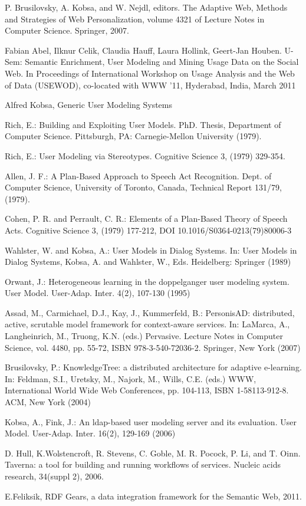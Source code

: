 \begin{thebibliography}{99}

 P. Brusilovsky, A. Kobsa, and W. Nejdl, editors. The Adaptive Web, Methods and Strategies of Web Personalization, volume 4321 of Lecture Notes in Computer Science. Springer, 2007.

 Fabian Abel, Ilknur Celik, Claudia Hauff, Laura Hollink, Geert-Jan Houben. U-Sem: Semantic Enrichment, User Modeling and Mining Usage Data on the Social Web. In Proceedings of International Workshop on Usage Analysis and the Web of Data (USEWOD), co-located with WWW '11, Hyderabad, India, March 2011

 Alfred Kobsa, Generic User Modeling Systems 

 Rich, E.: Building and Exploiting User Models. PhD. Thesis, Department of Computer Science. Pittsburgh, PA: Carnegie-Mellon University (1979). 

 Rich, E.: User Modeling via Stereotypes. Cognitive Science 3, (1979) 329-354.

 Allen, J. F.: A Plan-Based Approach to Speech Act Recognition. Dept. of Computer Science, University of Toronto, Canada, Technical Report 131/79, (1979).

 Cohen, P. R. and Perrault, C. R.: Elements of a Plan-Based Theory of Speech Acts. Cognitive Science 3, (1979) 177-212, DOI 10.1016/S0364-0213(79)80006-3

 Wahlster, W. and Kobsa, A.: User Models in Dialog Systems. In: User Models in Dialog Systems, Kobsa, A. and Wahlster, W., Eds. Heidelberg: Springer (1989)

 Orwant, J.: Heterogeneous learning in the doppelganger user modeling system. User Model. User-Adap. Inter. 4(2), 107-130 (1995)

 Assad, M., Carmichael, D.J., Kay, J., Kummerfeld, B.: PersonisAD: distributed, active, scrutable model
framework for context-aware services. In: LaMarca, A., Langheinrich, M., Truong, K.N. (eds.) Pervasive. Lecture Notes in Computer Science, vol. 4480, pp. 55-72, ISBN 978-3-540-72036-2. Springer,
New York (2007)

 Brusilovsky, P.: KnowledgeTree: a distributed architecture for adaptive e-learning. In: Feldman, S.I.,
Uretsky, M., Najork, M., Wills, C.E. (eds.) WWW, International World Wide Web Conferences,
pp. 104-113, ISBN 1-58113-912-8. ACM, New York (2004)

 Kobsa, A., Fink, J.: An ldap-based user modeling server and its evaluation. User Model. User-Adap.
Inter. 16(2), 129-169 (2006)

 D. Hull, K.Wolstencroft, R. Stevens, C. Goble, M. R. Pocock, P. Li, and T. Oinn.
Taverna: a tool for building and running workflows of services. Nucleic acids
research, 34(suppl 2), 2006.

 E.Feliksik, RDF Gears, a data integration framework for the Semantic Web, 2011.

\end{thebibliography}
